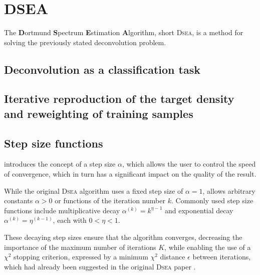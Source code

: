 \section{DSEA} %
The \textbf{D}ortmund \textbf{S}pectrum \textbf{E}stimation \textbf{A}lgorithm,
  short \textsc{Dsea},
is a method for solving the previously stated deconvolution problem.

\subsection{Deconvolution as a classification task} %
\blindtext[2]

\subsection{Iterative reproduction of the target density and reweighting of training samples} %
\blindtext[5]

\subsection{Step size functions} \label{sec:dsea:dsea:stepsize}
\dseaplus introduces the concept of a step size $\alpha$,
which allows the user to control the speed of convergence,
which in turn has a significant impact on the quality of the result.

While the original \textsc{Dsea} algorithm uses a fixed step size of $\alpha = 1$,
\dseaplus allows arbitrary constants $\alpha > 0$
or functions of the iteration number $k$.
Commonly used step size functions include
multiplicative decay
  $\alpha^{(k)} = k^{\eta - 1}$
and exponential decay
  $\alpha^{(k)} = \eta^{(k - 1)}$,
each with $0 < \eta < 1$.

These decaying step sizes ensure that the algorithm converges,
decreasing the importance of the maximum number of iterations $K$,
while enabling the use of a $\chi^2$ stopping criterion,
  expressed by a minimum $\chi^2$ distance $\epsilon$ between iterations,
  which had already been suggested in the original \textsc{Dsea} paper \cite{dsea_tim}.


